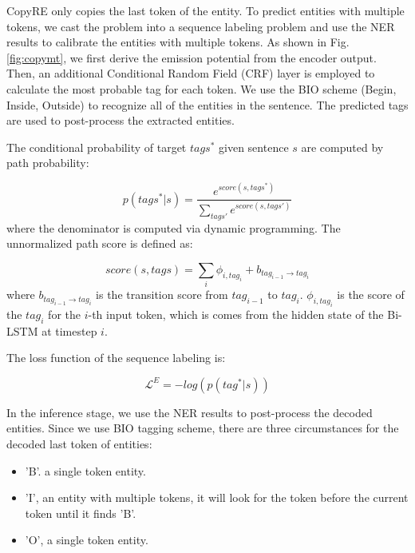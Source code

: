 \documentclass[letterpaper]{article} \usepackage{aaai20}  \usepackage{times}  \usepackage{helvet} \usepackage{courier}  \usepackage[hyphens]{url}  \usepackage{graphicx}
\begin{document}
  CopyRE only copies the last token of the entity. 
  To predict entities with multiple tokens, we cast the problem into a sequence labeling problem and use the NER results to calibrate the entities with multiple tokens. 
  As shown in Fig. \ref{fig:copymt}, we first derive the emission potential from the encoder output.
  Then, an additional Conditional Random Field (CRF) layer \cite{crf} is employed to calculate the most probable tag for each token.
We use the BIO scheme (Begin, Inside, Outside) to recognize all of the entities in the sentence. 
  The predicted tags are used to post-process the extracted entities. 
  
  The conditional probability of target $tags^*$ given sentence $s$ are computed by path probability:
  
  \begin{equation}
      p(tags^*|s) = \frac{e^{score(s, tags^*)}}{\sum_{tags'}e^{score(s, tags')}}
  \end{equation}
  where the denominator is computed via dynamic programming. The unnormalized path score is defined as: 
  
  \begin{equation}
      score(s,tags) = \sum_{i} \phi_{i,tag_i} + b_{tag_{i-1}\rightarrow tag_i}
  \end{equation}
  where $b_{tag_{i-1}\rightarrow tag_i}$ is the transition score from $tag_{i-1}$ to $tag_i$.
  $\phi_{i,tag_i}$ is the score of the $tag_i$ for the $i$-th input token, which is comes from the hidden state of the Bi-LSTM at timestep $i$.
  
  The loss function of the sequence labeling is:
  
  \begin{equation}
      \mathcal{L}^E = -log(p(tag^*|s))
  \label{eq:losse}
  \end{equation}
  
  In the inference stage, we use the NER results to post-process the decoded entities. Since we use BIO tagging scheme, there are three circumstances for the decoded last token of entities:
  \begin{itemize}
    \item 'B'. a single token entity.
    \item 'I', an entity with multiple tokens, it will look for the token before the current token until it finds 'B'. 
    \item 'O', a single token entity.
  \end{itemize}
\end{document}
